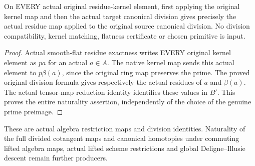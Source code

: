\begin{theorem}
\label{thm:witt-two-actual-kernel-division-naturality}
\leanok
{}
On EVERY actual original residue-kernel element, first applying
the original kernel map and then the actual target canonical
division gives precisely the actual residue map applied to the
original source canonical division. No division compatibility,
kernel matching, flatness certificate or chosen primitive is input.
\end{theorem}
\begin{proof}
Actual smooth-flat residue exactness writes EVERY original kernel
element as $pa$ for an actual $a\in A$. The native kernel map
sends this actual element to $p\beta(a)$, since the original
ring map preserves the prime. The proved original division
formula gives respectively the actual residues of $a$ and
$\beta(a)$. The actual tensor-map reduction identity identifies
these values in $B'$. This proves the entire naturality assertion,
independently of the choice of the genuine prime preimage.
\end{proof}

These are actual algebra restriction maps and division identities.
Naturality of the full divided cotangent maps and canonical
homotopies under commuting lifted algebra maps, actual lifted
scheme restrictions and global Deligne--Illusie descent remain
further producers.
